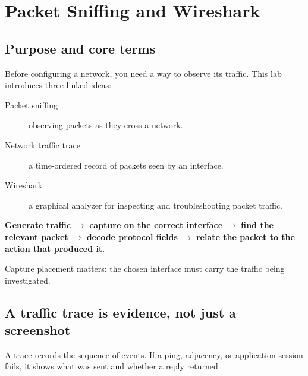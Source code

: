 \chapter{Packet Sniffing and Wireshark}\label{ch:wireshark}

\section{Purpose and core terms}
Before configuring a network, you need a way to observe its traffic. This lab introduces three linked ideas:
\begin{description}
  \item[Packet sniffing] observing packets as they cross a network.
  \item[Network traffic trace] a time-ordered record of packets seen by an interface.
  \item[Wireshark] a graphical analyzer for inspecting and troubleshooting packet traffic.
\end{description}

\begin{conceptmap}
\textbf{Generate traffic} $\rightarrow$ \textbf{capture on the correct interface} $\rightarrow$ \textbf{find the relevant packet} $\rightarrow$ \textbf{decode protocol fields} $\rightarrow$ \textbf{relate the packet to the action that produced it}.
\end{conceptmap}


Capture placement matters: the chosen interface must carry the traffic being investigated.

\section{A traffic trace is evidence, not just a screenshot}
A trace records the sequence of events. If a ping, adjacency, or application session fails, it shows what was sent and whether a reply returned.


